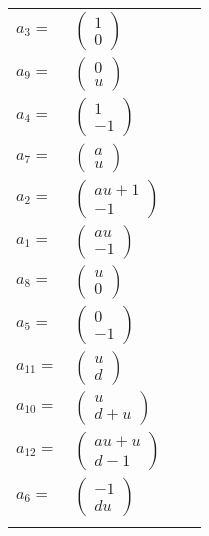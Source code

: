 \documentclass[1p]{elsarticle_modified}
\theoremstyle{definition}
\begin{document}
\begin{tabular}{m{7pt} m{180pt} m{7pt} m{180pt} }
\flushright $a_{3}=$&$\begin{pmatrix}1\\0\end{pmatrix}$ \\
\flushright $a_{9}=$&$\begin{pmatrix}0\\u\end{pmatrix}$ \\
\flushright $a_{4}=$&$\begin{pmatrix}1\\-1\end{pmatrix}$ \\
\flushright $a_{7}=$&$\begin{pmatrix}a\\u\end{pmatrix}$ \\
\flushright $a_{2}=$&$\begin{pmatrix}a u+1\\-1\end{pmatrix}$ \\
\flushright $a_{1}=$&$\begin{pmatrix}a u\\-1\end{pmatrix}$ \\
\flushright $a_{8}=$&$\begin{pmatrix}u\\0\end{pmatrix}$ \\
\flushright $a_{5}=$&$\begin{pmatrix}0\\-1\end{pmatrix}$ \\
\flushright $a_{11}=$&$\begin{pmatrix}u\\d\end{pmatrix}$ \\
\flushright $a_{10}=$&$\begin{pmatrix}u\\d+u\end{pmatrix}$ \\
\flushright $a_{12}=$&$\begin{pmatrix}a u+u\\d-1\end{pmatrix}$ \\
\flushright $a_{6}=$&$\begin{pmatrix}-1\\d u\end{pmatrix}$\\&\end{tabular}
\end{document}
